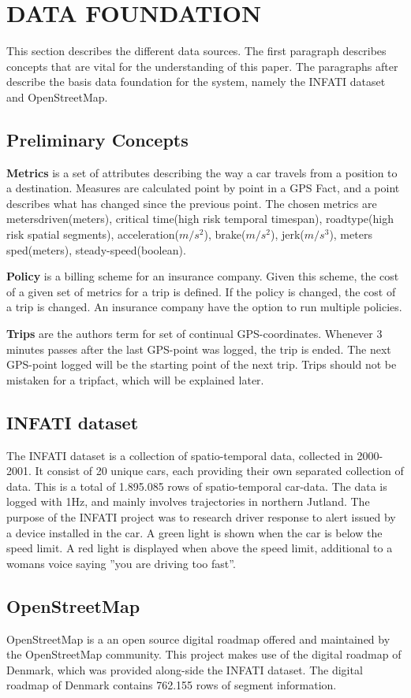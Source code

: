 \section{DATA FOUNDATION}\label{sec:datafound}

This section describes the different data sources. The first paragraph describes concepts that are vital for the understanding of this paper.
The paragraphs after describe the basis data foundation for the system, namely the INFATI dataset and OpenStreetMap.

\subsection{Preliminary Concepts}\label{subsec:precon}
\textbf{Metrics} is a set of attributes describing the way a car travels from a position  to a destination. Measures are calculated point by point in a GPS Fact, and a point describes what has changed since the previous point. The chosen metrics are metersdriven(meters), critical time(high risk temporal timespan), roadtype(high risk spatial segments), acceleration($m/s^2$), brake($m/s^2$), jerk($m/s^3$), meters sped(meters), steady-speed(boolean). 

\textbf{Policy} is a billing scheme for an insurance company. Given this scheme, the cost of a given set of metrics for a trip is defined. If the policy is changed, the cost of a trip is changed. An insurance company have the option to run multiple policies.

\textbf{Trips} are the authors term for set of continual GPS-coordinates. Whenever 3 minutes passes after the last GPS-point was logged, the trip is ended. The next GPS-point logged will be the starting point of the next trip. Trips should not be mistaken for a tripfact, which will be explained later.

\subsection{INFATI dataset}
The INFATI dataset\cite{art:INFATI} is a collection of spatio-temporal data, collected in 2000-2001. It consist of 20 unique cars, each providing their own separated collection of data. This is a total of 1.895.085 rows of spatio-temporal car-data. The data is logged with 1Hz, and mainly involves trajectories in northern Jutland. The purpose of the INFATI\cite{art:INFATI} project was to research driver response to alert issued by a device installed in the car. A green light is shown when the car is below the speed limit. A red light is displayed when above the speed limit, additional to a womans voice saying ''you are driving too fast''.

\subsection{OpenStreetMap}
OpenStreetMap\cite{osm} is a an open source digital roadmap offered  and maintained by the OpenStreetMap community. This project makes use of the digital roadmap of Denmark, which was provided along-side the INFATI dataset\cite{art:INFATI}. The digital roadmap of Denmark contains 762.155 rows of segment information.